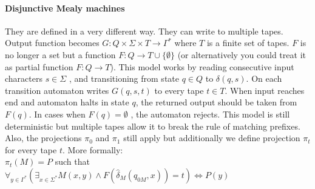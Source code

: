 \documentclass[12pt]{article}
\begin{document}
\paragraph{Disjunctive Mealy machines} They are defined in a very different way. They can write to multiple   tapes. Output function becomes $G: Q \times \Sigma \times T \rightarrow \Gamma^*$ where $T$ is a finite set of tapes. $F$ is no longer a set but a function $F: Q \rightarrow T \cup \{\emptyset\}$ (or alternatively you could treat it as partial function $F: Q \rightarrow T$). This model works by reading consecutive input characters $s \in \Sigma$ , and transitioning from state $q\in Q$ to $\delta(q,s)$. On each transition automaton writes  $G(q,s,t)$ to every tape $t \in T$. When input reaches end and automaton halts in state $q$, the returned output should be taken from $F(q)$. In cases when $F(q) = \emptyset$ , the automaton rejects. This model is still deterministic but multiple tapes allow it to break the rule of matching prefixes.
Also, the projections $\pi_0$ and $\pi_1$ still apply but additionally we define projection $\pi_t$ for every tape $t$. More formally:\\
$\pi_t(M) = P$ such that $\forall_{y\in\Gamma^*} (\exists_{x\in\Sigma^*} M(x,y) \wedge F(\hat{\delta}_M(q_{0M},x))=t) \iff P(y)$
\end{document}
